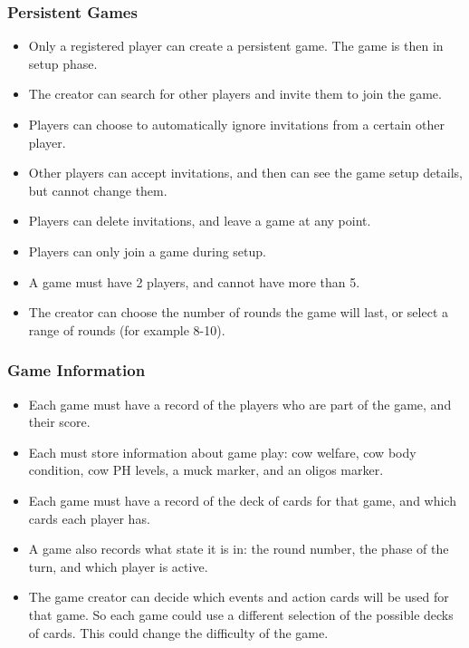 	\subsubsection{Persistent Games}
	  \begin{itemize}
	  	\item \pA Only a registered player can create a persistent game. The game is then in setup phase.
	  	\item \pB The creator can search for other players and invite them to join the game.
	  	\item \pD Players can choose to automatically ignore invitations from a certain other player.
	  	\item \pB Other players can accept invitations, and then can see the game setup details, but cannot change them.
	  	\item \pB Players can delete invitations, and leave a game at any point.
	  	\item \pA Players can only join a game during setup.
	  	\item \pB A game must have 2 players, and cannot have more than 5.
	  	\item \pB The creator can choose the number of rounds the game will last, or select a range of rounds (for example 8-10).
	  \end{itemize}
	\subsubsection{Game Information}
	  \begin{itemize}
	  	\item \pA Each game must have a record of the players who are part of the game, and their score.
	  	\item \pA Each must store information about game play: cow welfare, cow body condition, cow PH levels, a muck marker, and an oligos marker.
	  	\item \pA Each game must have a record of the deck of cards for that game, and which cards each player has.
	  	\item \pA A game also records what state it is in: the round number, the phase of the turn, and which player is active.
	  	\item \pD The game creator can decide which events and action cards will be used for that game. So each game could use a different selection of the possible decks of cards. This could change the difficulty of the game.
	  \end{itemize}
